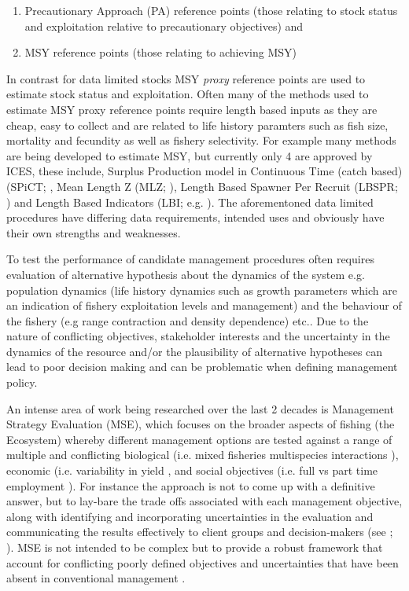 \documentclass[preprint,review,12pt]{elsarticle}
\begin{document}
\begin{enumerate}
  \item Precautionary Approach (PA) reference points (those relating to stock status and exploitation relative to precautionary objectives) and 
  \item MSY reference points (those relating to achieving MSY) 
\end{enumerate}

In contrast for data limited stocks MSY \emph{proxy} reference points are used to estimate stock status and exploitation.  Often many of the methods used to estimate MSY proxy reference points require length based inputs as they are cheap, easy to collect \cite{quinn1999quantitative} and are related to life history paramters such as fish size, mortality and fecundity as well as fishery selectivity. For example many methods are being developed to estimate MSY, but currently only 4 are approved by ICES, these include, Surplus Production model in Continuous Time (catch based) (SPiCT; \cite{pedersen2017stochastic}, Mean Length Z (MLZ; \cite{gedamke2006estimating}), Length Based Spawner Per Recruit (LBSPR; \cite{hordyk2014some}) and Length Based Indicators (LBI; e.g. \cite{probst2013indicator}). The aforementoned data limited procedures have differing data requirements, intended uses and obviously have their own strengths and weaknesses. 

To test the performance of candidate management procedures often requires evaluation of alternative hypothesis about the dynamics of the system e.g. population dynamics (life history dynamics such as growth parameters which are an indication of fishery exploitation levels and management) and the behaviour of the fishery (e.g range contraction and density dependence) etc.. Due to the nature of conflicting objectives, stakeholder interests and the uncertainty in the dynamics of the resource and/or the plausibility of alternative hypotheses can lead to poor decision making and can be problematic when defining management policy.

An intense area of work being researched over the last 2 decades is Management Strategy Evaluation (MSE), which focuses on the broader aspects of fishing (the Ecosystem) whereby different management options are tested against a range of multiple and conflicting biological (i.e. mixed fisheries multispecies interactions \cite{blanchard2014evaluating}), economic (i.e. variability in yield \cite{smith2011impacts}, and social objectives (i.e. full vs part time employment \cite{plaganyi2013integrating}). For instance the approach is not to come up with a definitive answer, but to lay-bare the trade offs associated with each management objective, along with identifying and incorporating uncertainties in the evaluation and communicating the results effectively to client groups and decision-makers (see \cite{kell2007flr}; \cite{punt2015strategic}). MSE is not intended to be complex but to provide a robust framework that account for conflicting poorly defined objectives and uncertainties that have been absent in conventional management \cite{kell2007flr}. 
\end{document}
